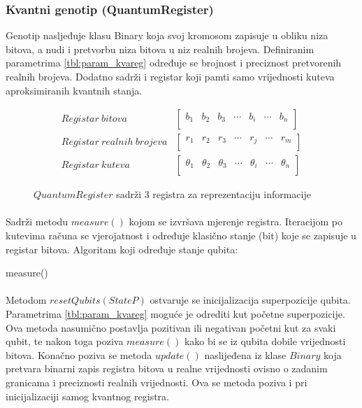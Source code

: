 \documentclass[times, utf8, zavrsni, numeric]{fer}
\begin{document}
\subsubsection{Kvantni genotip (QuantumRegister)}
Genotip nasljeđuje klasu Binary koja svoj kromosom zapisuje u obliku niza bitova, a nudi i pretvorbu niza bitova u niz realnih brojeva. Definiranim parametrima \ref{tbl:param_kvareg} određuje se brojnost i preciznost pretvorenih realnih brojeva. Dodatno sadrži i registar koji pamti samo vrijednosti kuteva aproksimiranih kvantnih stanja.
\begin{figure}[htb]
\centering
\begin{align*}
Registar\ bitova &
\begin{bmatrix}
b_1 & b_2 & b_3 & \cdots & b_i & \cdots & b_n \\
\end{bmatrix} \\
Registar\ realnih\ brojeva &
\begin{bmatrix}
r_1 & r_2 & r_3 & \cdots & r_j & \cdots & r_m \\
\end{bmatrix} \\
Registar\ kuteva &
\begin{bmatrix}
\theta_1 & \theta_2 & \theta_3 & \cdots & \theta_i & \cdots & \theta_n \\
\end{bmatrix}
\end{align*}
\caption{$QuantumRegister$ sadrži 3 registra za reprezentaciju informacije}
\end{figure}

\paragraph{}
Sadrži metodu $measure()$ kojom se izvršava mjerenje registra. Iteracijom po kutevima računa se vjerojatnost i određuje klasično stanje (bit) koje se zapisuje u registar bitova. Algoritam koji određuje stanje qubita:
\begin{algorithm}
\caption{measure()}
\label{algo:measure}
\begin{algorithmic}
\ENDFOR
\end{algorithmic}
\end{algorithm}

\paragraph{}
Metodom $resetQubits(StateP)$ ostvaruje se inicijalizacija superpozicije qubita. Parametrima \ref{tbl:param_kvareg} moguće je odrediti kut početne superpozicije. Ova metoda nasumično postavlja pozitivan ili negativan početni kut za svaki qubit, te nakon toga poziva $measure()$ kako bi se iz qubita dobile vrijednosti bitova. Konačno poziva se metoda $update()$ naslijeđena iz klase $Binary$ koja pretvara binarni zapis registra bitova u realne vrijednosti ovisno o zadanim granicama i preciznosti realnih vrijednosti. Ova se metoda poziva i pri inicijalizaciji samog kvantnog registra.
\end{document}
